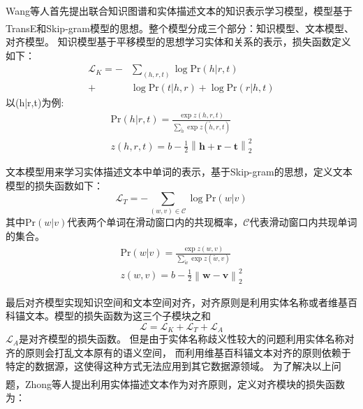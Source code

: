 \documentclass[twocolumn]{article}
\newcommand{\upcite}[1]{\textsuperscript{\textsuperscript{\cite{#1}}}}
\begin{document}
	Wang等人\upcite{Wang}首先提出联合知识图谱和实体描述文本的知识表示学习模型，模型基于TransE\upcite{TransE}和Skip-gram\cite{Skipgram}模型的思想。整个模型分成三个部分：知识模型、文本模型、对齐模型。
	知识模型基于平移模型的思想学习实体和关系的表示，损失函数定义如下：
	\begin{equation}
	\begin{split}
	\mathcal{L}_K=-&\sum_{(h,r,t)}\log \text{Pr}(h|r,t) \\
	+& \log \text{Pr}(t|h,r)+\log \text{Pr}(r|h,t)
	\end{split}
	\end{equation}
	以(h|r,t)为例:
	\begin{gather}	
	\text{Pr}(h|r,t)=\frac{\exp{z(h,r,t)}}{\sum_{\widetilde{h}}\exp{z(\widetilde{h},r,t)}} \\
	z(h,r,t)=b-\frac{1}{2}\left \| \textbf{h}+\textbf{r}-\textbf{t} \right \|_2^2
	\end{gather}
	
	文本模型用来学习实体描述文本中单词的表示，基于Skip-gram的思想，定义文本模型的损失函数如下：
	\begin{equation}
	\mathcal{L}_T=-\sum_{(w,v)\in \mathcal{C}}\log \text{Pr}(w|v)
	\end{equation}
	其中$\text{Pr}(w|v)$代表两个单词在滑动窗口内的共现概率，$\mathcal{C}$代表滑动窗口内共现单词的集合。
	\begin{gather}
	\text{Pr}(w|v)=\frac{\exp{z(w,v)}}{\sum_{\widetilde{w}}\exp{z(\widetilde{w},v)}} \\
	z(w,v)=b-\frac{1}{2}\left \|\textbf{w}-\textbf{v}  \right \|_2^2
	\end{gather}

	最后对齐模型实现知识空间和文本空间对齐，对齐原则是利用实体名称或者维基百科锚文本。模型的损失函数为这三个子模块之和
	\begin{equation}
	\mathcal{L}=\mathcal{L}_K+\mathcal{L}_T+\mathcal{L}_A
	\end{equation}
	$\mathcal{L}_A$是对齐模型的损失函数。
	但是由于实体名称歧义性较大的问题利用实体名称对齐的原则会打乱文本原有的语义空间，
	而利用维基百科锚文本对齐的原则依赖于特定的数据源，这使得这种方式无法应用到其它数据源领域。
	为了解决以上问题，Zhong等人\upcite{Zhong}提出利用实体描述文本作为对齐原则，定义对齐模块的损失函数为：
	
\end{document}
